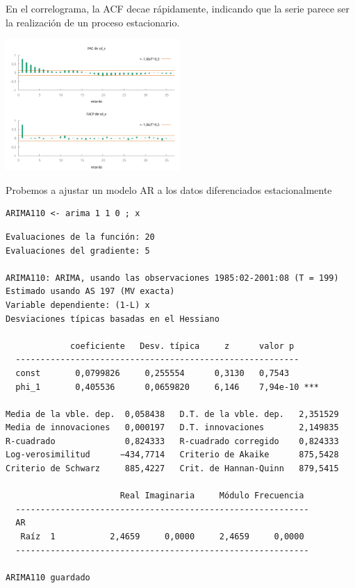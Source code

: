 \documentclass[10pt]{article}
\begin{document}
En el correlograma, la ACF decae rápidamente, indicando que la serie
parece ser la realización de un proceso estacionario.

\begin{center}
\includegraphics[width=0.5\textwidth]{./SegundoEjercicioIdentificacionModeloARIMA/sd_x_ACF-PACF.png}
\end{center}

Probemos a ajustar un modelo AR a los datos diferenciados estacionalmente

\begin{verbatim}
ARIMA110 <- arima 1 1 0 ; x
\end{verbatim}

\begin{verbatim}
Evaluaciones de la función: 20
Evaluaciones del gradiente: 5

ARIMA110: ARIMA, usando las observaciones 1985:02-2001:08 (T = 199)
Estimado usando AS 197 (MV exacta)
Variable dependiente: (1-L) x
Desviaciones típicas basadas en el Hessiano

             coeficiente   Desv. típica     z      valor p 
  ---------------------------------------------------------
  const       0,0799826     0,255554      0,3130   0,7543  
  phi_1       0,405536      0,0659820     6,146    7,94e-10 ***

Media de la vble. dep.  0,058438   D.T. de la vble. dep.   2,351529
Media de innovaciones   0,000197   D.T. innovaciones       2,149835
R-cuadrado              0,824333   R-cuadrado corregido    0,824333
Log-verosimilitud      −434,7714   Criterio de Akaike      875,5428
Criterio de Schwarz     885,4227   Crit. de Hannan-Quinn   879,5415

                       Real Imaginaria     Módulo Frecuencia
  -----------------------------------------------------------
  AR
   Raíz  1           2,4659     0,0000     2,4659     0,0000
  -----------------------------------------------------------

ARIMA110 guardado
\end{verbatim}
\end{document}
